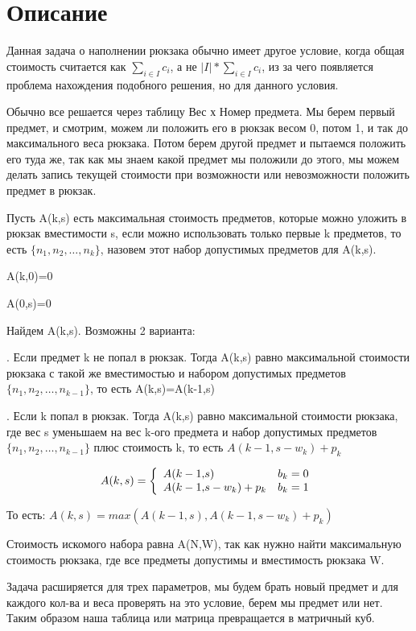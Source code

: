 \section{Описание}

Данная задача о наполнении рюкзака обычно имеет другое условие, когда общая стоимость считается как $\sum_{i \in I} c_{i}$, а не $|I| * \sum_{i \in I} c_{i}$, из за чего появляется проблема нахождения подобного решения, но для данного условия.

Обычно все решается через таблицу Вес х Номер предмета. Мы берем первый предмет, и смотрим, можем ли положить его в рюкзак весом 0, потом 1, и так до максимального веса рюкзака. Потом берем другой предмет и пытаемся положить его туда же, так как мы знаем какой предмет мы положили до этого, мы можем делать запись текущей стоимости при возможности или невозможности положить предмет в рюкзак.

Пусть A(k,s) есть максимальная стоимость предметов, которые можно уложить в рюкзак вместимости s, если можно использовать только первые k предметов, то есть $ \{ n_{1},n_{2}, \dots ,n_{k} \} $, назовем этот набор допустимых предметов для A(k,s).

A(k,0)=0

A(0,s)=0

Найдем A(k,s). Возможны 2 варианта:

. Если предмет k не попал в рюкзак. Тогда A(k,s) равно максимальной стоимости рюкзака с такой же вместимостью и набором допустимых предметов $ \{ n_{1}, n_{2}, \dots , n_{k-1} \} $, то есть A(k,s)=A(k-1,s)

. Если k попал в рюкзак. Тогда A(k,s) равно максимальной стоимости рюкзака, где вес s уменьшаем на вес k-ого предмета и набор допустимых предметов $ \{ n_{1},n_{2}, \dots ,n_{k-1} \} $ плюс стоимость k, то есть $A(k-1,s-w_{k})+p_{k}$

\[
A(k,s) = \left\{ \begin{array}{ll}
A(k-1 {,} s) & b_{k}=0\\ 
A(k-1 {,} s - w_{k}) + p_{k} & b_{k}=1\\
\end{array}
\right. \\
\]
  
То есть: $A(k,s)=max(A(k-1,s),A(k-1,s-w_{k})+p_{k})$

Стоимость искомого набора равна A(N,W), так как нужно найти максимальную стоимость рюкзака, где все предметы допустимы и вместимость рюкзака W.

Задача расширяется для трех параметров, мы будем брать новый предмет и для каждого кол-ва и веса проверять на это условие, берем мы предмет или нет. Таким образом наша таблица или матрица превращается в матричный куб.

